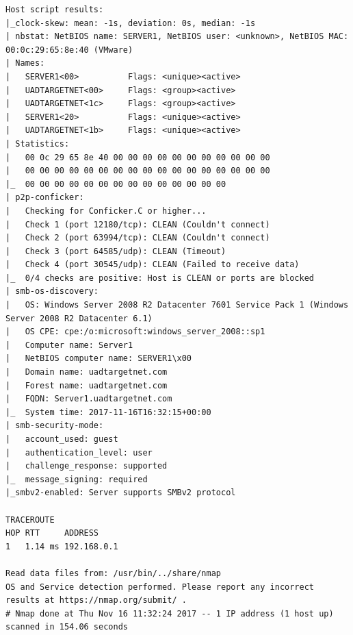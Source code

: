 \documentclass[12pt,a4paper]{article}
\begin{document}
\begin{appendices}
\begin{lstlisting}
Host script results:
|_clock-skew: mean: -1s, deviation: 0s, median: -1s
| nbstat: NetBIOS name: SERVER1, NetBIOS user: <unknown>, NetBIOS MAC: 00:0c:29:65:8e:40 (VMware)
| Names:
|   SERVER1<00>          Flags: <unique><active>
|   UADTARGETNET<00>     Flags: <group><active>
|   UADTARGETNET<1c>     Flags: <group><active>
|   SERVER1<20>          Flags: <unique><active>
|   UADTARGETNET<1b>     Flags: <unique><active>
| Statistics:
|   00 0c 29 65 8e 40 00 00 00 00 00 00 00 00 00 00 00
|   00 00 00 00 00 00 00 00 00 00 00 00 00 00 00 00 00
|_  00 00 00 00 00 00 00 00 00 00 00 00 00 00
| p2p-conficker:
|   Checking for Conficker.C or higher...
|   Check 1 (port 12180/tcp): CLEAN (Couldn't connect)
|   Check 2 (port 63994/tcp): CLEAN (Couldn't connect)
|   Check 3 (port 64585/udp): CLEAN (Timeout)
|   Check 4 (port 30545/udp): CLEAN (Failed to receive data)
|_  0/4 checks are positive: Host is CLEAN or ports are blocked
| smb-os-discovery:
|   OS: Windows Server 2008 R2 Datacenter 7601 Service Pack 1 (Windows Server 2008 R2 Datacenter 6.1)
|   OS CPE: cpe:/o:microsoft:windows_server_2008::sp1
|   Computer name: Server1
|   NetBIOS computer name: SERVER1\x00
|   Domain name: uadtargetnet.com
|   Forest name: uadtargetnet.com
|   FQDN: Server1.uadtargetnet.com
|_  System time: 2017-11-16T16:32:15+00:00
| smb-security-mode:
|   account_used: guest
|   authentication_level: user
|   challenge_response: supported
|_  message_signing: required
|_smbv2-enabled: Server supports SMBv2 protocol

TRACEROUTE
HOP RTT     ADDRESS
1   1.14 ms 192.168.0.1

Read data files from: /usr/bin/../share/nmap
OS and Service detection performed. Please report any incorrect results at https://nmap.org/submit/ .
# Nmap done at Thu Nov 16 11:32:24 2017 -- 1 IP address (1 host up) scanned in 154.06 seconds
			\end{lstlisting}

\end{appendices}
\end{document}
